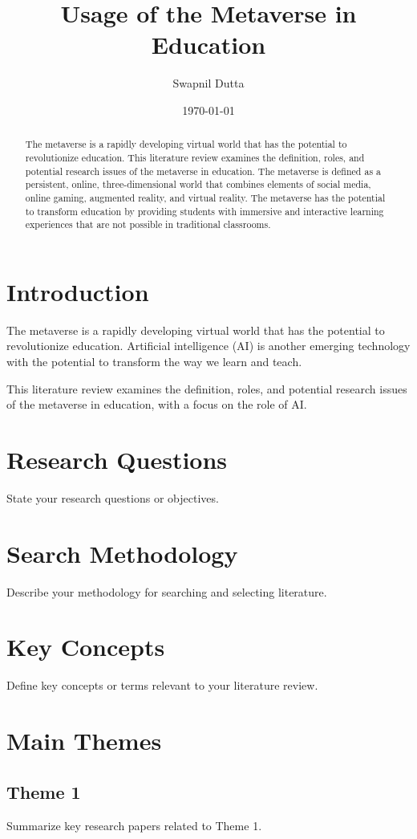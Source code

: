 \documentclass{article}
\title{Usage of the Metaverse in Education}
\author{Swapnil Dutta}
\date{\today}
\begin{document}
\maketitle

\begin{abstract}
The metaverse is a rapidly developing virtual world that has the potential to revolutionize education. This literature review examines the definition, roles, and potential research issues of the metaverse in education. The metaverse is defined as a persistent, online, three-dimensional world that combines elements of social media, online gaming, augmented reality, and virtual reality. The metaverse has the potential to transform education by providing students with immersive and interactive learning experiences that are not possible in traditional classrooms.
\end{abstract}

\section{Introduction}
The metaverse is a rapidly developing virtual world that has the potential to revolutionize education. Artificial intelligence (AI) is another emerging technology with the potential to transform the way we learn and teach.

This literature review examines the definition, roles, and potential research issues of the metaverse in education, with a focus on the role of AI.
\section{Research Questions}
State your research questions or objectives.

\section{Search Methodology}
Describe your methodology for searching and selecting literature.

\section{Key Concepts}
Define key concepts or terms relevant to your literature review.

\section{Main Themes}
\subsection{Theme 1}
Summarize key research papers related to Theme 1.
\end{document}
